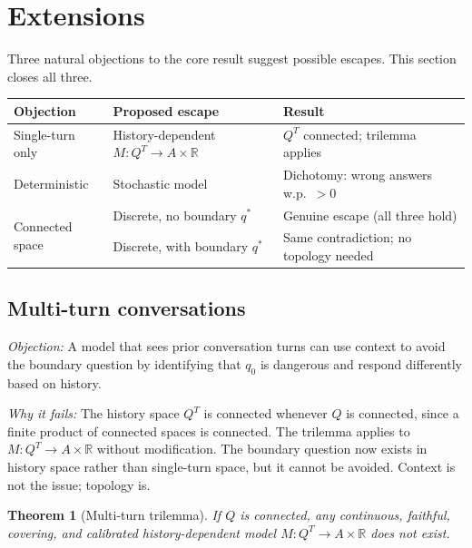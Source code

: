 \documentclass[10pt]{article}
\newtheorem{theorem}{Theorem}[section]
\newcommand{\R}{\mathbb{R}}
\begin{document}
\section{Extensions}
\label{sec:extensions}

Three natural objections to the core result suggest possible escapes.
This section closes all three.

\begin{center}
\small
\renewcommand{\arraystretch}{1.3}
\begin{tabular}{lll}
\toprule
\textbf{Objection} & \textbf{Proposed escape} & \textbf{Result} \\
\midrule
Single-turn only & History-dependent $M: Q^T \to A\times\R$ & $Q^T$ connected; trilemma applies \\
Deterministic & Stochastic model & Dichotomy: wrong answers w.p.\ $>0$ \\
\multirow{2}{*}{Connected space} & Discrete, no boundary $q^*$ & Genuine escape (all three hold) \\
 & Discrete, with boundary $q^*$ & Same contradiction; no topology needed \\
\bottomrule
\end{tabular}
\end{center}

\subsection{Multi-turn conversations}
\label{sec:multi-turn}

\textit{Objection:} A model that sees prior conversation turns can use
context to avoid the boundary question by identifying that $q_0$ is
dangerous and respond differently based on history.

\textit{Why it fails:} The history space $Q^T$ is connected whenever $Q$
is connected, since a finite product of connected spaces is connected. The
trilemma applies to $M\colon Q^T \to A \times \R$ without modification.
The boundary question now exists in history space rather than single-turn
space, but it cannot be avoided. Context is not the issue; topology is.

\begin{theorem}[Multi-turn trilemma]
\label{thm:multi-turn}
If $Q$ is connected, any continuous, faithful, covering, and calibrated
history-dependent model $M\colon Q^T \to A \times \R$ does not exist.
\end{theorem}
\end{document}
